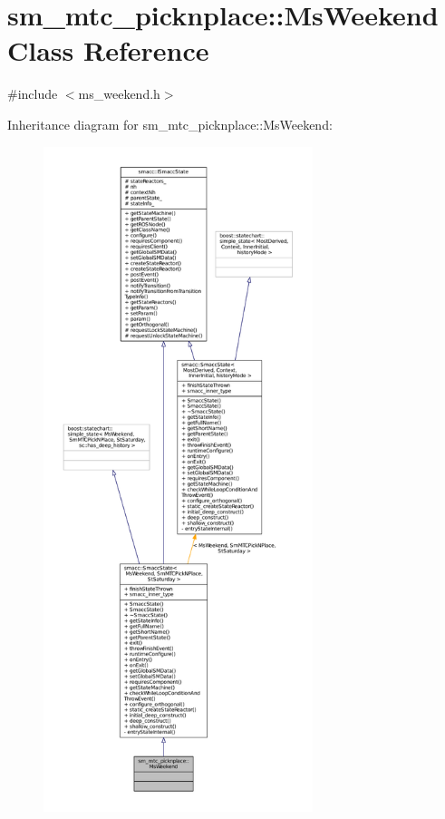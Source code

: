 \hypertarget{classsm__mtc__picknplace_1_1MsWeekend}{}\section{sm\+\_\+mtc\+\_\+picknplace\+:\+:Ms\+Weekend Class Reference}
\label{classsm__mtc__picknplace_1_1MsWeekend}


{\ttfamily \#include $<$ms\+\_\+weekend.\+h$>$}



Inheritance diagram for sm\+\_\+mtc\+\_\+picknplace\+:\+:Ms\+Weekend\+:
\nopagebreak
\begin{figure}[H]
\begin{center}
\leavevmode
\includegraphics[height=550pt]{classsm__mtc__picknplace_1_1MsWeekend__inherit__graph}
\end{center}
\end{figure}


